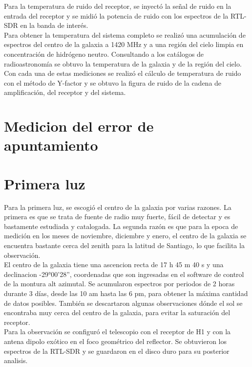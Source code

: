 Para la temperatura de ruido del receptor, se inyectó la señal de ruido en la entrada del receptor y se midió la potencia de ruido con los espectros de la RTL-SDR en la banda de interés.\\

Para obtener la temperatura del sistema completo se realizó una acumulación de espectros del centro de la galaxia a 1420 MHz y a una región del cielo limpia en concentración de hidrógeno neutro. Consultando a los catálogos de radioastronomía se obtuvo la temperatura de la galaxia y de la región del cielo.\\

Con cada una de estas mediciones se realizó el cálculo de temperatura de ruido con el método de Y-factor y se obtuvo la figura de ruido de la cadena de amplificación, del receptor y del sistema.\\


\section{Medicion del error de apuntamiento}

\section{Primera luz}

Para la primera luz, se escogió el centro de la galaxia por varias razones. La primera es que se trata de fuente de radio muy fuerte, fácil de detectar y es bastamente estudiada y catalogada. La segunda razón es que para la epoca de medición en los meses de noviembre, diciembre y enero, el centro de la galaxia se encuentra bastante cerca del zenith para la latitud de Santiago, lo que facilita la observación.\\

El centro de la galaxia tiene una ascencion recta de 17 h 45 m 40 s y una declinacion -29°00'28'', coordenadas que son ingresadas en el software de control de la montura alt azimutal. Se acumularon espectros por periodos de 2 horas durante 3 días, desde las 10 am hasta las 6 pm, para obtener la máxima cantidad de datos posibles. También se descartaron algunas observaciones dónde el sol se encontraba muy cerca del centro de la galaxia, para evitar la saturación del receptor.\\

Para la observación se configuró el telescopio con el receptor de H1 y con la antena dipolo exótico en el foco geométrico del reflector. Se obtuvieron los espectros de la RTL-SDR y se guardaron en el disco duro para su posterior analisis.\\
